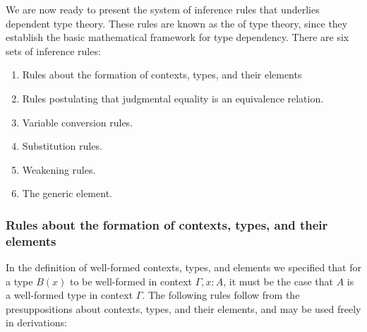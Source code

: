 We are now ready to present the system of inference rules that underlies dependent type theory. These rules are known as the  of type theory, since they establish the basic mathematical framework for type dependency. There are six sets of inference rules:
\begin{enumerate}
\item Rules about the formation of contexts, types, and their elements
\item Rules postulating that judgmental equality is an equivalence relation.
\item Variable conversion rules.
\item Substitution rules.
\item Weakening rules.
\item The generic element.
\end{enumerate}

\subsubsection*{Rules about the formation of contexts, types, and their elements}
In the definition of well-formed contexts, types, and elements we specified that for a type $B(x)$ to be well-formed in context $\Gamma,x:A$, it must be the case that $A$ is a well-formed type in context $\Gamma$. The following rules follow from the presuppositions about contexts, types, and their elements, and may be used freely in derivations:

